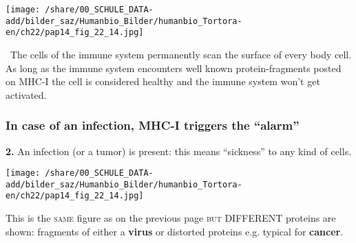 	\begin{minipage}{14cm}
	 \centering
		\texttt{[image: /share/00\_SCHULE\_DATA-add/bilder\_saz/Humanbio\_Bilder/humanbio\_Tortora-en/ch22/pap14\_fig\_22\_14.jpg]}
	\end{minipage}
\vspace{2cm}

%

\vfill \bgroup \centering
\Pointinghand\, The cells of the immune system permanently scan the surface of every body cell. As long as the immune system encounters well known protein-fragments posted on MHC-I the cell is considered healthy and the immune system won't get activated. \egroup
\vfill

\clearpage
\subsubsection{In case of an infection, MHC-I triggers the "`alarm"'}
\vspace{0.2cm}
\begin{mdframed}[style=RedGray] \textbf{2.} An infection (or a tumor) is present: this means "`sickness"' to any kind of cells. \end{mdframed}

	\begin{minipage}{16cm}
	 \centering \vspace{0.4cm}
		\texttt{[image: /share/00\_SCHULE\_DATA-add/bilder\_saz/Humanbio\_Bilder/humanbio\_Tortora-en/ch22/pap14\_fig\_22\_14.jpg]}
	\end{minipage}
	\vspace{0.2cm} This is the \textsc{same} figure as on the previous page \textsc{but} DIFFERENT proteins are shown: fragments of either a \textbf{virus} or distorted proteins e.g. typical for \textbf{cancer}.

